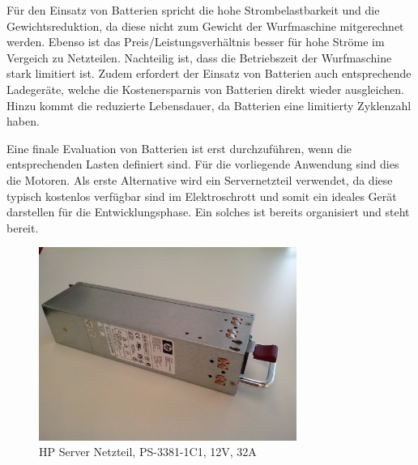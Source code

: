 Für den Einsatz von Batterien spricht die hohe Strombelastbarkeit und die
Gewichtsreduktion, da diese nicht zum Gewicht der Wurfmaschine mitgerechnet
werden. Ebenso ist das Preis/Leistungsverhältnis besser für
hohe Ströme im Vergeich zu Netzteilen. Nachteilig ist, dass die Betriebszeit
der Wurfmaschine stark limitiert ist. Zudem erfordert der Einsatz von
Batterien auch entsprechende Ladegeräte, welche die Kostenersparnis von
Batterien direkt wieder ausgleichen. Hinzu kommt die reduzierte Lebensdauer,
da Batterien eine limitierty Zyklenzahl haben. 

Eine finale Evaluation von Batterien ist erst durchzuführen, wenn die
entsprechenden Lasten definiert sind. Für die vorliegende Anwendung sind
dies die Motoren. Als erste Alternative wird ein Servernetzteil verwendet,
da diese typisch kostenlos verfügbar sind im Elektroschrott und somit ein
ideales Gerät darstellen für die Entwicklungsphase. Ein solches ist bereits
organisiert und steht bereit.

\begin{figure}[h!]
	\centering
	\includegraphics[width=0.75\textwidth]{../../fig/netzteil.jpg}
	\caption{HP Server Netzteil, PS-3381-1C1, 12V, 32A}
	\label{fig:server-power}
\end{figure}
